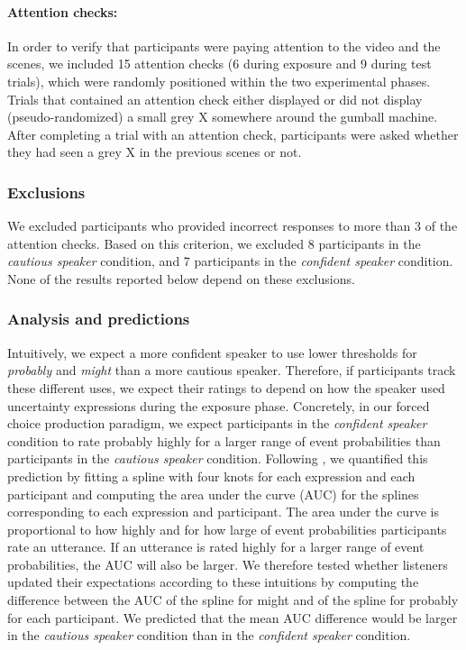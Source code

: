 \documentclass[man, floatsintext]{apa6}
\begin{document}
\paragraph{Attention checks:}  In order to verify that participants were paying attention to the video and the scenes, we included 15 attention checks (6 during exposure and 9 during test trials), which were randomly positioned within the two experimental phases. Trials that contained an attention check either displayed or did not display (pseudo-randomized) a small grey X somewhere around the gumball machine. After completing a trial with an attention check, participants were asked whether they had seen a grey X in the previous scenes or not.

\subsubsection{Exclusions} We excluded participants who provided incorrect responses to more than 3 of the attention checks. Based on this criterion, we excluded 8 participants in the \textit{cautious speaker} condition, and 7 participants in the \textit{confident speaker} condition. None of the results reported below depend on these exclusions.


\subsubsection{Analysis and predictions}  

Intuitively, we expect a more confident speaker to use lower thresholds for {\it probably} and {\it might} than a more cautious speaker.
Therefore, if participants track these different uses, we expect their ratings to depend on how the speaker used uncertainty expressions during the exposure phase. 
Concretely,  in our forced choice production paradigm, we expect participants in the \textit{confident speaker} condition to rate {\sc probably} highly for a larger range of event probabilities than participants
in the \textit{cautious speaker} condition. 
Following \cite{Yildirim2016}, we quantified this prediction by fitting a spline with four knots for each expression and each participant and computing the area 
under the curve (AUC) for the splines corresponding to each expression and participant. The area under the curve is proportional to how highly and for how large 
of event probabilities participants rate an utterance. If an utterance is rated highly for a larger range of event probabilities, the AUC will also be larger. 
We therefore tested whether listeners updated their expectations according to these intuitions by computing the difference between the AUC of the spline for 
{\sc might} and of the spline for {\sc probably} for each participant. We predicted that the mean AUC difference would be larger in the 
\emph{cautious speaker} condition than in the \emph{confident speaker} condition.
\end{document}
